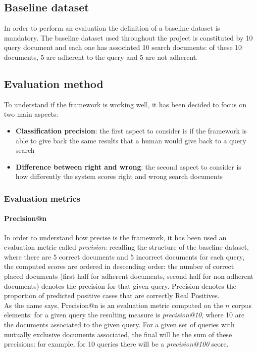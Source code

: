 \documentclass[\main/main.tex]{subfiles}
\begin{document}
\subsection{Baseline dataset}
In order to perform an evaluation the definition of a baseline dataset is mandatory. The baseline dataset used throughout the project is constituted by 10 query document and each one has associated 10 search documents: of these 10 documents, 5 are adherent to the query and 5 are not adherent.
\subsection{Evaluation method}
To understand if the framework is working well, it has been decided to focus on two main aspects:
\begin{itemize}
    \item \textbf{Classification precision}: the first aspect to consider is if the framework is able to give back the same results that a human would give back to a query search
    \item \textbf{Difference between right and wrong}: the second aspect to consider is how differently the system scores right and wrong search documents
\end{itemize}
\subsubsection{Evaluation metrics}
\paragraph{Precision@n} In order to understand how precise is the framework, it has been used an evaluation metric called \emph{precision}: recalling the structure of the baseline dataset, where there are 5 correct documents and 5 incorrect documents for each query, the computed scores are ordered in descending order: the number of correct placed documents (first half for adherent documents, second half for non adherent documents) denotes the precision for that given query. Precision denotes the proportion of predicted positive cases that are correctly Real Positives\cite{DBLP:journals/corr/abs-2010-16061}.\\
As the name says, Precision@n is an evaluation metric computed on the $n$ corpus elements: for a given query the resulting measure is \emph{precision@10}, where 10 are the documents associated to the given query. For a given set of queries with mutually exclusive documents associated, the final will be the sum of these precisions: for example, for 10 queries there will be a \emph{precision@100} score.
\end{document}
